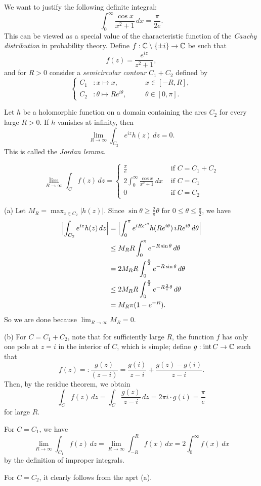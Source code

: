 \documentclass{../../large}
\begin{document}
\begin{prb}
We want to justify the following definite integral:
\[\int_0^\infty\frac{\cos x}{x^2+1}\,dx=\frac\pi{2e}.\]
This can be viewed as a special value of the characteristic function of the \emph{Cauchy distribution} in probability theory.
Define $f:\mathbb{C}\setminus\{\pm i\}\to\mathbb{C}$ be such that
\[f(z)=\frac{e^{iz}}{z^2+1},\]
and for $R>0$ consider a \emph{semicircular contour} $C_1+C_2$ defined by
\[\left\{
\begin{alignedat}{2}
C_1&:x\mapsto x,&\quad&x\in[-R,R],\\
C_2&:\theta\mapsto Re^{i\theta},&&\theta\in[0,\pi].
\end{alignedat}
\right.\]
\begin{parts}
\item Let $h$ be a holomorphic function on a domain containing the arcs $C_2$ for every large $R>0$.
If $h$ vanishes at infinity, then
\[\lim_{R\to\infty}\int_{C_2}e^{iz}h(z)\,dz=0.\]
This is called the \emph{Jordan lemma}.
\item
\[\lim_{R\to\infty}\int_Cf(z)\,dz=\begin{cases}
\frac\pi e&\text{ if }C=C_1+C_2\\
2\int_0^\infty\frac{\cos x}{x^2+1}\,dx&\text{ if }C=C_1\\
0&\text{ if }C=C_2
\end{cases}\]
\end{parts}
\end{prb}
\begin{pf}
(a)
Let $M_R=\max_{z\in C_2}|h(z)|$.
Since $\sin\theta\ge\frac2\pi\theta$ for $0\le\theta\le\frac\pi2$, we have
\begin{align*}
\Bigl|\int_{C_2}e^{iz}h(z)\,dz\Bigr|
&=\Bigl|\int_0^\pi e^{iRe^{i\theta}}h(Re^{i\theta})\,iRe^{i\theta}\,d\theta\Bigr|\\
&\le M_RR\int_0^\pi e^{-R\sin\theta}\,d\theta\\
&=2M_RR\int_0^{\frac\pi2}e^{-R\sin\theta}\,d\theta\\
&\le2M_RR\int_0^{\frac\pi2}e^{-R\frac2\pi\theta}\,d\theta\\\
&=M_R\pi(1-e^{-R}).
\end{align*}
So we are done because $\lim_{R\to\infty}M_R=0$.

(b)
For $C=C_1+C_2$, note that for sufficiently large $R$, the function $f$ has only one pole at $z=i$ in the interior of $C$, which is simple; define $g:\operatorname{int}C\to\mathbb{C}$ such that
\[f(z)=:\frac{g(z)}{(z-i)}=\frac{g(i)}{z-i}+\frac{g(z)-g(i)}{z-i}.\]
Then, by the residue theorem, we obtain
\[\int_Cf(z)\,dz=\int_C\frac{g(z)}{z-i}\,dz=2\pi i\cdot g(i)=\frac\pi e\]
for large $R$.

For $C=C_1$, we have
\[\lim_{R\to\infty}\int_{C_1}f(z)\,dz=\lim_{R\to\infty}\int_{-R}^Rf(x)\,dx=2\int_0^\infty f(x)\,dx\]
by the definition of improper integrals.

For $C=C_2$, it clearly follows from the aprt (a).
\end{pf}
\end{document}
